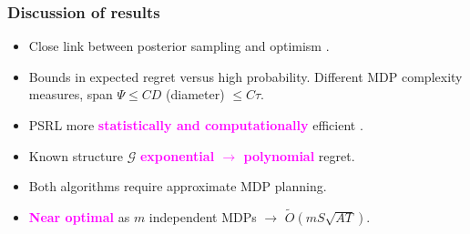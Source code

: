 \documentclass{beamer}
\newlength{\wideitemsep}
\let\olditem\item
\renewcommand{\item}{\setlength{\itemsep}{\wideitemsep}\olditem}
\newcommand{\Exp}{\mathds{E}}
\newcommand{\Xc}{\mathcal{X}}
\newcommand{\Qc}{\mathcal{Q}}
\newcommand{\Gc}{\mathcal{G}}
\newcommand{\Sc}{\mathcal{S}}
\newcommand{\bspace}{\vspace{3mm}}
\newcommand{\hilite}[1]{\textcolor{magenta}{\textbf{#1}}}
\begin{document}
\begin{frame}
\frametitle{Discussion of results}

\begin{itemize}
    \item Close link between posterior sampling and optimism \cite{russo2013}.
    \bspace
    \item Bounds in expected regret versus high probability. Different MDP complexity measures, span $\Psi \le CD$ (diameter) $\le C \tau$.
    \bspace
    \item PSRL more \hilite{statistically and computationally} efficient \cite{osband2013more}.
    \bspace
    \item Known structure $\Gc$ \hilite{exponential $\rightarrow$ polynomial} regret.
    \bspace
    \item Both algorithms require approximate MDP planning.
    \bspace
    \item \hilite{Near optimal} as $m$ independent MDPs $\rightarrow$ $\tilde{O}(mS\sqrt{AT})$.

\end{itemize}
\end{frame}



\end{document}

